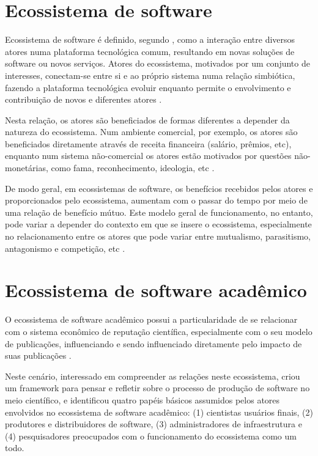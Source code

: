 \section{Ecossistema de software}

Ecossistema de software é definido, segundo ,
como a interação entre diversos atores numa plataforma tecnológica comum,
resultando em novas soluções de software ou novos serviços. Atores do
ecossistema, motivados por um conjunto de interesses, conectam-se entre si e ao
próprio sistema numa relação simbiótica, fazendo a plataforma tecnológica
evoluir enquanto permite o envolvimento e contribuição de novos e diferentes
atores \cite{manikas2013software}.

Nesta relação, os atores são beneficiados de formas diferentes a depender da
natureza do ecossistema. Num ambiente comercial, por exemplo, os atores são
beneficiados diretamente através de receita financeira (salário, prêmios, etc),
enquanto num sistema não-comercial os atores estão motivados por questões
não-monetárias, como fama, reconhecimento, ideologia, etc
\cite{manikas2013software}.

De modo geral, em ecossistemas de software, os benefícios recebidos pelos
atores e proporcionados pelo ecossistema, aumentam com o passar do tempo por
meio de uma relação de benefício mútuo.  Este modelo geral de funcionamento, no
entanto, pode variar a depender do contexto em que se insere o ecossistema,
especialmente no relacionamento entre os atores que pode variar entre
mutualismo, parasitismo, antagonismo e competição, etc
\cite{manikas2013software}.

\section{Ecossistema de software acadêmico}

O ecossistema de software acadêmico possui a particularidade de se relacionar
com o sistema econômico de reputação científica, especialmente com o seu modelo
de publicações, influenciando e sendo influenciado diretamente pelo impacto de
suas publicações \cite{howison2015understanding}.

Neste cenário, interessado em compreender as relações neste ecossistema,
 criou um framework para pensar e refletir
sobre o processo de produção de software no meio científico, e identificou quatro
papéis básicos assumidos pelos atores envolvidos no ecossistema de software acadêmico: 
(1) cientistas usuários finais, (2) produtores e distribuidores de software, (3)
administradores de infraestrutura e (4) pesquisadores preocupados com o
funcionamento do ecossistema como um todo.

